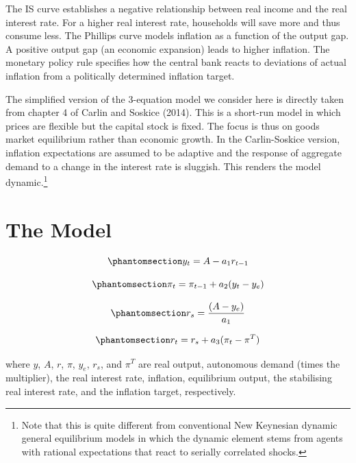 \documentclass[
  letterpaper,
  DIV=11,
  numbers=noendperiod]{scrreprt}
\begin{document}
The IS curve establishes a negative relationship between real income and
the real interest rate. For a higher real interest rate, households will
save more and thus consume less. The Phillips curve models inflation as
a function of the output gap. A positive output gap (an economic
expansion) leads to higher inflation. The monetary policy rule specifies
how the central bank reacts to deviations of actual inflation from a
politically determined inflation target.

The simplified version of the 3-equation model we consider here is
directly taken from chapter 4 of Carlin and Soskice (2014). This is a
short-run model in which prices are flexible but the capital stock is
fixed. The focus is thus on goods market equilibrium rather than
economic growth. In the Carlin-Soskice version, inflation expectations
are assumed to be adaptive and the response of aggregate demand to a
change in the interest rate is sluggish. This renders the model
dynamic.\footnote{Note that this is quite different from conventional
  New Keynesian dynamic general equilibrium models in which the dynamic
  element stems from agents with rational expectations that react to
  serially correlated shocks.}

\section{The Model}\label{the-model-6}

\begin{equation}\phantomsection\label{eq-nk_y}{
y_t=A -a_1r_{t-1}
}\end{equation}

\begin{equation}\phantomsection\label{eq-nk_pi}{
\pi_t=\pi_{t-1}+a_2(y_t -y_e)
}\end{equation}

\begin{equation}\phantomsection\label{eq-nk_rs}{
r_s=\frac{(A - y_e)}{a_1}
}\end{equation}

\begin{equation}\phantomsection\label{eq-nk_r}{
r_t = r_s + a_3(\pi_t-\pi^T)
}\end{equation}

where \(y\), \(A\), \(r\), \(\pi\), \(y_e\), \(r_s\), and \(\pi^T\) are
real output, autonomous demand (times the multiplier), the real interest
rate, inflation, equilibrium output, the stabilising real interest rate,
and the inflation target, respectively.
\end{document}
